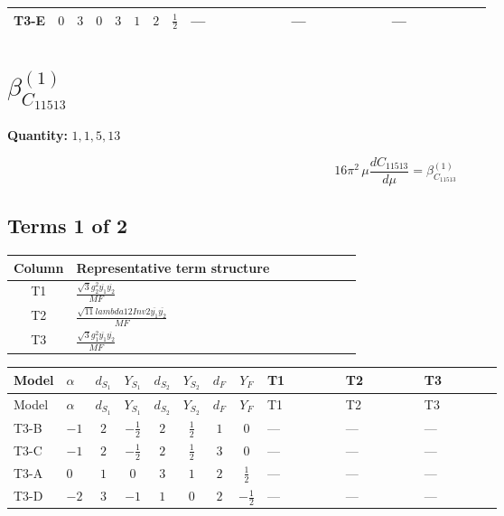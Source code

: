 \documentclass[8pt]{article}
\begin{document}
\begin{landscape}
\begin{longtable}{@{}llcccccc >{\raggedright\arraybackslash}p{0.21\linewidth} >{\raggedright\arraybackslash}p{0.21\linewidth} >{\raggedright\arraybackslash}p{0.21\linewidth}@{}}
\midrule
T3-E & $0$ & $3$ & $0$ & $3$ & $1$ & $2$ & $\frac{1}{2}$ & --- & --- & --- \\
\midrule
\bottomrule
\end{longtable}
\clearpage
\section*{$\beta_{C_{11513}}^{(1)}$}
\noindent\textbf{Quantity: }$\mathrm{1,1,5,13}$\par\smallskip
\[16\pi^2\,\mu\frac{d C_{11513}}{d\mu}=\beta_{C_{11513}}^{(1)}\]
\subsection*{Terms 1 of 2}
\begin{center}
\begin{tabular}{@{}c >{\raggedright\arraybackslash}p{0.82\linewidth}@{}}
\toprule
Column & Representative term structure \\
\midrule
T1 & \(\displaystyle \frac{\sqrt{3} g_{2}^{2} \overline{y_{1}} \overline{y_{2}}}{MF}\) \\
\midrule
T2 & \(\displaystyle \frac{\sqrt{11} lambda12Inv2 \overline{y_{1}} \overline{y_{2}}}{MF}\) \\
\midrule
T3 & \(\displaystyle \frac{\sqrt{3} g_{1}^{2} \overline{y_{1}} \overline{y_{2}}}{MF}\) \\
\midrule
\bottomrule
\end{tabular}
\end{center}
\smallskip
\tiny
\begin{longtable}{@{}llcccccc >{\raggedright\arraybackslash}p{0.21\linewidth} >{\raggedright\arraybackslash}p{0.21\linewidth} >{\raggedright\arraybackslash}p{0.21\linewidth}@{}}
\toprule
Model & $\alpha$ & $d_{S_1}$ & $Y_{S_1}$ & $d_{S_2}$ & $Y_{S_2}$ & $d_F$ & $Y_F$ & T1 & T2 & T3 \\
\midrule
\endfirsthead
\toprule
Model & $\alpha$ & $d_{S_1}$ & $Y_{S_1}$ & $d_{S_2}$ & $Y_{S_2}$ & $d_F$ & $Y_F$ & T1 & T2 & T3 \\
\midrule
\endhead
T3-B & $-1$ & $2$ & $-\frac{1}{2}$ & $2$ & $\frac{1}{2}$ & $1$ & $0$ & --- & --- & --- \\
\midrule
T3-C & $-1$ & $2$ & $-\frac{1}{2}$ & $2$ & $\frac{1}{2}$ & $3$ & $0$ & --- & --- & --- \\
\midrule
T3-A & $0$ & $1$ & $0$ & $3$ & $1$ & $2$ & $\frac{1}{2}$ & --- & --- & --- \\
\midrule
T3-D & $-2$ & $3$ & $-1$ & $1$ & $0$ & $2$ & $-\frac{1}{2}$ & --- & --- & --- \\

\end{longtable}
\end{landscape}
\end{document}
